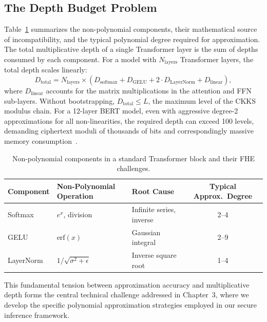 \subsection{The Depth Budget Problem}
\label{sec:depth_budget}

Table~\ref{tab:nonlinear_components} summarizes the non-polynomial components, their mathematical source of incompatibility, and the typical polynomial degree required for approximation. The total multiplicative depth of a single Transformer layer is the sum of depths consumed by each component. For a model with $N_{\text{layers}}$ Transformer layers, the total depth scales linearly:
\begin{equation}
    D_{\text{total}} = N_{\text{layers}} \times \left(D_{\text{softmax}} + D_{\text{GELU}} + 2 \cdot D_{\text{LayerNorm}} + D_{\text{linear}}\right),
    \label{eq:total_depth}
\end{equation}
where $D_{\text{linear}}$ accounts for the matrix multiplications in the attention and FFN sub-layers. Without bootstrapping, $D_{\text{total}} \leq L$, the maximum level of the CKKS modulus chain. For a 12-layer BERT model, even with aggressive degree-2 approximations for all non-linearities, the required depth can exceed 100 levels, demanding ciphertext moduli of thousands of bits and correspondingly massive memory consumption~\cite{hao2022iron}.

\begin{table}[ht]
\centering
\caption{Non-polynomial components in a standard Transformer block and their FHE challenges.}
\label{tab:nonlinear_components}
\begin{tabular}{|l|l|l|c|}
\hline
\textbf{Component} & \textbf{Non-Polynomial Operation} & \textbf{Root Cause} & \textbf{Typical Approx.\ Degree} \\ \hline
Softmax             & $e^x$, division                   & Infinite series, inverse  & 2--4       \\ \hline
GELU                & $\mathrm{erf}(x)$                 & Gaussian integral         & 2--9       \\ \hline
LayerNorm           & $1/\sqrt{\sigma^2+\epsilon}$      & Inverse square root       & 1--4       \\ \hline
\end{tabular}
\end{table}

This fundamental tension between approximation accuracy and multiplicative depth forms the central technical challenge addressed in Chapter~3, where we develop the specific polynomial approximation strategies employed in our secure inference framework.


